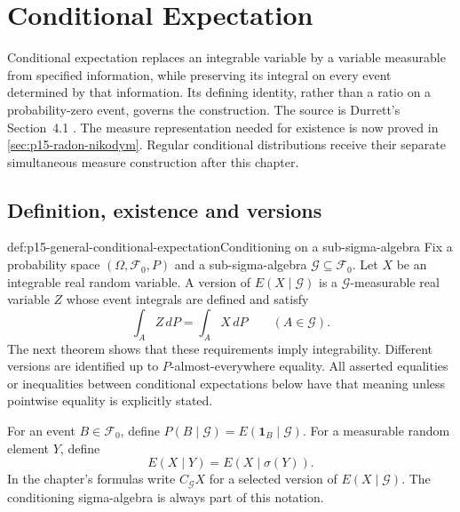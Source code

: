 \chapter{Conditional Expectation}
\label{sec:p15-conditional-expectation}

Conditional expectation replaces an integrable variable by a variable
measurable from specified information, while preserving its integral on
every event determined by that information. Its defining identity,
rather than a ratio on a probability-zero event, governs the construction.
The source is Durrett's Section~4.1
\cite[pp.~205--217]{DurrettPTEAuthor2019}.
The measure representation needed for existence is now proved in
\cref{sec:p15-radon-nikodym}. Regular conditional distributions receive
their separate simultaneous measure construction after this chapter.

\section{Definition, existence and versions}
\label{sec:p15-conditional-existence}

\begin{hbdefinition}{def:p15-general-conditional-expectation}{Conditioning on a sub-sigma-algebra}
Fix a probability space \((\Omega,\mathcal F_0,P)\) and a
sub-sigma-algebra \(\mathcal G\subseteq\mathcal F_0\).
Let \(X\) be an integrable real random variable.
A version of \(E(X\mid\mathcal G)\) is a \(\mathcal G\)-measurable
real variable \(Z\) whose event integrals are defined and satisfy
\[
                       \int_A Z\,dP=\int_A X\,dP
                                      \qquad(A\in\mathcal G).
\]
The next theorem shows that these requirements imply integrability.
Different versions are identified up to \(P\)-almost-everywhere equality.
All asserted equalities or inequalities between conditional expectations
below have that meaning unless pointwise equality is explicitly stated.

For an event \(B\in\mathcal F_0\), define
\(P(B\mid\mathcal G)=E(\mathbf1_B\mid\mathcal G)\).
For a measurable random element \(Y\), define
\[
                         E(X\mid Y)=E(X\mid\sigma(Y)).
\]
In the chapter's formulas write \(C_{\mathcal G}X\) for a selected
version of \(E(X\mid\mathcal G)\).
The conditioning sigma-algebra is always part of this notation.
\end{hbdefinition}

